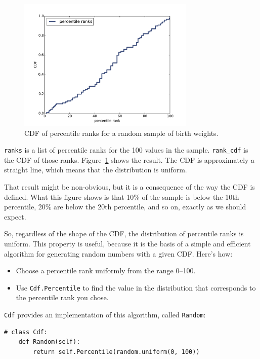 \documentclass[12pt]{book}
\begin{document}
\begin{figure}
\centerline{\includegraphics[height=2.5in]{figs/cumulative_random.pdf}}
\caption{CDF of percentile ranks for a random sample of birth weights.}
\label{cumulative_random}
\end{figure}

{\tt ranks} is a list of percentile ranks for the 100 values
in the sample.  \verb"rank_cdf" is the CDF of those ranks.
Figure~\ref{cumulative_random} shows the result.  The CDF is
approximately a straight line, which means that the distribution
is uniform.

That result might be non-obvious, but it is a consequence of
the way the CDF is defined.  What this figure shows is that 10\%
of the sample is below the 10th percentile, 20\% are below the
20th percentile, and so on, exactly as we should expect.

So, regardless of the shape of the CDF, the distribution of
percentile ranks is uniform.  This property is useful, because it
is the basis of a simple and efficient algorithm for generating
random numbers with a given CDF.  Here's how:

\begin{itemize}

\item Choose a percentile rank uniformly from the range 0--100.

\item Use {\tt Cdf.Percentile} to find the value in the distribution
that corresponds to the percentile rank you chose.

\end{itemize}

{\tt Cdf} provides an implementation of this algorithm, called
{\tt Random}:

\begin{verbatim}
# class Cdf:
    def Random(self):
        return self.Percentile(random.uniform(0, 100))
\end{verbatim}
\end{document}

